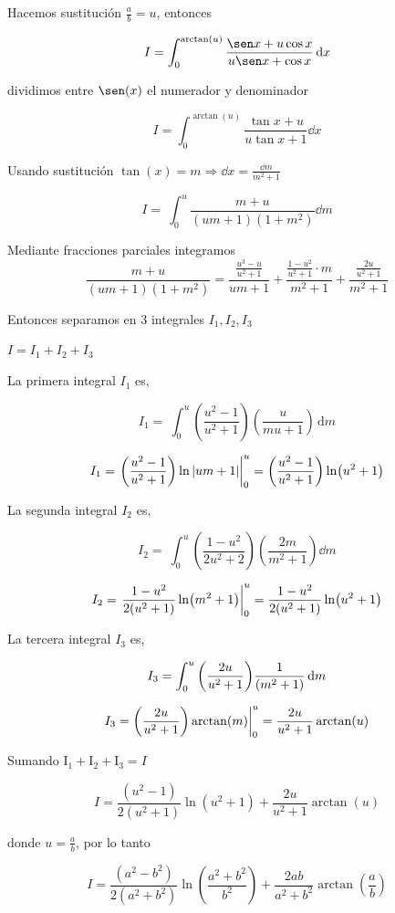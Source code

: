 {Hacemos sustitución $\frac{a}{b} =u $, entonces

$$
I= \int_{0}^{ \arctan(u) } \frac{\sen x +u\cos x}{u \sen x+\cos x}\dd{x}
$$

dividimos entre $\sen(x)$ el numerador y denominador

$$
I= \int_{0}^{ \arctan(u) } \frac{\tan x +u}{u \tan x+1} \dd{x}
$$

Usando sustitución $\tan(x) =m  \Rightarrow \dd{x} =\frac{\dd{m}}{m^2 +1} $
  
$$
 I= \ \int_{0}^{ u } \frac{m +u}{(um +1)(1+m ^2 )}\dd{m}
$$

Mediante fracciones parciales integramos
\[
\frac{m + u}{(u m + 1)(1 + m^2)} = \frac{\frac{u^3 - u}{u^2 + 1}}{u m + 1} + \frac{\frac{1 - u^2}{u^2 + 1} \cdot m}{m^2 + 1}+ \frac{\frac{2u}{u^2 + 1}}{m^2 + 1} 
\]

Entonces separamos en 3 integrales $I_1, I_2, I_3$

$
I= I_1+I_2+I_3
$ 

La primera integral $I_1$  es,

$$
I_1= \ \int_{0}^{ u } \left(\frac{u^2-1}{u^2+1} \right) \left(\frac{u}{mu+1} \right)  \, \mathrm{d} m 
$$

$$
I_1=\eval{ \left(\frac{u^2-1}{u^2+1} \right) \ln \vert um+1 \vert }_0^u = \left(\frac{u^2-1}{u^2+1} \right) \ln (u^2+1)
$$

La segunda integral $I_2$  es,

$$
I_2=\ \int_{0}^{ u }
\left( \frac{1-u^2}{2u^2+2}\right)\left(\frac{2m}{m^2+1} \right) \dd{m}
$$

$$
I_2 =\eval{ \frac{1-u^2}{2(u^2+1)} \ln (m^2+1)}_{0}^{u} = \frac{1-u^2}{2(u^2+1)} \ln (u^2+1)
$$
 
La tercera integral $I_3$  es,
 
$$
I_3= \int_{0}^{ u } \pqty{\frac{2u}{u^2+1}} \frac{1}{(m^2+1)} \dd{m}
$$

$$
I_3=\pqty{\frac{2u}{u^2+1}}\arctan(m)  \bigg \rvert_0^u=\frac{2u}{u^2+1} \arctan(u) 
$$

Sumando $\mathrm{I_1}+ \mathrm{I_2}+ \mathrm{I_3}=I$

$$
I= \frac{(u^2-1)}{2(u^2+1)} \ln (u^2+1)+\frac{2u}{u^2+1} \arctan(u)$$

donde $  u=\frac{a}{b} $, por lo tanto

\begin{LnxRptaBox}
	$$ 
	I= \frac{(a^2-b^2)}{2(a^2+b^2)} \ln \left(\frac{a^2+b^2}{b^2} \right)+\frac{2ab}{a^2+b^2} \arctan(\frac{a}{b})
	$$
\end{LnxRptaBox}

}
